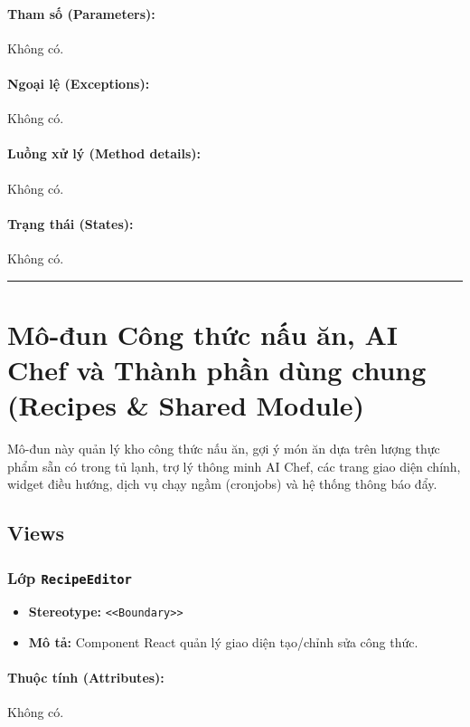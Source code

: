 \documentclass[12pt,a4paper]{article}
\begin{document}
\paragraph{Tham số (Parameters):}
Không có.

\paragraph{Ngoại lệ (Exceptions):}
Không có.

\paragraph{Luồng xử lý (Method details):}
Không có.

\paragraph{Trạng thái (States):}
Không có.

\vskip 0.5cm
\noindent\rule{\textwidth}{0.5pt}
\vskip 0.5cm

\section{Mô-đun Công thức nấu ăn, AI Chef và Thành phần dùng chung (Recipes \& Shared Module)}

Mô-đun này quản lý kho công thức nấu ăn, gợi ý món ăn dựa trên lượng thực phẩm sẵn có trong tủ lạnh, trợ lý thông minh AI Chef, các trang giao diện chính, widget điều hướng, dịch vụ chạy ngầm (cronjobs) và hệ thống thông báo đẩy.

\subsection{Views}


\subsubsection{Lớp \texttt{RecipeEditor}}

\begin{itemize}[leftmargin=*]
    \item \textbf{Stereotype:} \texttt{\textless{}\textless{}Boundary\textgreater{}\textgreater{}}
    \item \textbf{Mô tả:} Component React quản lý giao diện tạo/chỉnh sửa công thức.
\end{itemize}

\paragraph{Thuộc tính (Attributes):}
Không có.
\end{document}
